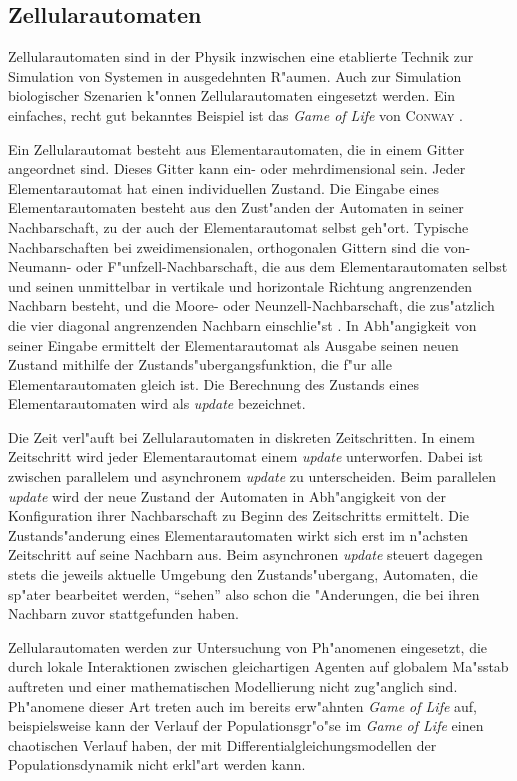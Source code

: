 \subsection{Zellularautomaten}

Zellularautomaten sind in der Physik inzwischen eine etablierte Technik zur Simulation von Syst\-emen in ausgedehnten
R"aumen. Auch zur Simulation biologischer Szenarien k"onnen Zellularautomaten eingesetzt werden. Ein einfaches, recht
gut bekanntes Beispiel ist das \textsl{Game of Life} von \textsc{Conway} \cite{Gardner70}.

Ein Zellularautomat besteht aus Elementarautomaten, die in einem Gitter angeordnet sind. Dieses Gitter kann ein- oder
mehrdimensional sein. Jeder Elementarautomat hat einen individuellen Zustand. Die Eingabe eines Elementarautomaten
besteht aus den Zust"anden der Automaten in seiner Nachbarschaft, zu der auch der Elementarautomat selbst geh"ort.
Typische Nachbarschaften bei zweidimensionalen, orthogonalen Gittern sind die von-Neumann- oder F"unfzell-Nachbarschaft, die
aus dem Elementarautomaten selbst und seinen unmittelbar in vertikale und horizontale Richtung angrenzenden Nachbarn
besteht, und die Moore- oder Neunzell-Nachbarschaft, die zus"atzlich die vier diagonal angrenzenden Nachbarn
einschlie"st \cite{Langton90}. In Abh"angigkeit von seiner Eingabe ermittelt der Elementarautomat als Ausgabe seinen
neuen Zustand mithilfe der Zustands"ubergangsfunktion, die f"ur alle Elementarautomaten gleich ist. Die Berechnung
des Zustands eines Elementarautomaten wird als \textsl{update} bezeichnet.

Die Zeit verl"auft bei Zellularautomaten in diskreten Zeitschritten. In einem Zeitschritt wird jeder Elementarautomat
einem \textsl{update} unterworfen. Dabei ist zwischen parallelem und asynchronem \textsl{update}
zu unterscheiden. Beim parallelen \textsl{update} wird der neue Zustand der Automaten in Abh"angigkeit von der
Konfiguration ihrer Nachbarschaft zu Beginn des Zeitschritts ermittelt. Die Zustands"anderung eines Elementarautomaten
wirkt sich erst im n"achsten Zeitschritt auf seine Nachbarn aus. Beim asynchronen \textsl{update} steuert dagegen stets die
jeweils aktuelle Umgebung den Zustands"ubergang, Automaten, die sp"ater bearbeitet werden, "`sehen"' also schon die
"Anderungen, die bei ihren Nachbarn zuvor stattgefunden haben.

Zellularautomaten werden zur Untersuchung von Ph"anomenen eingesetzt, die durch lokale Interaktionen zwischen
gleichartigen Agenten auf globalem Ma"sstab auftreten und einer mathematischen Modellierung nicht zug"anglich sind.
Ph"anomene dieser Art treten auch im bereits erw"ahnten \textsl{Game of Life} auf, beispielsweise kann der Verlauf
der Populationsgr"o"se im \textsl{Game of Life} einen chaotischen Verlauf haben, der mit Differentialgleichungsmodellen
der Populationsdynamik nicht erkl"art werden kann.


